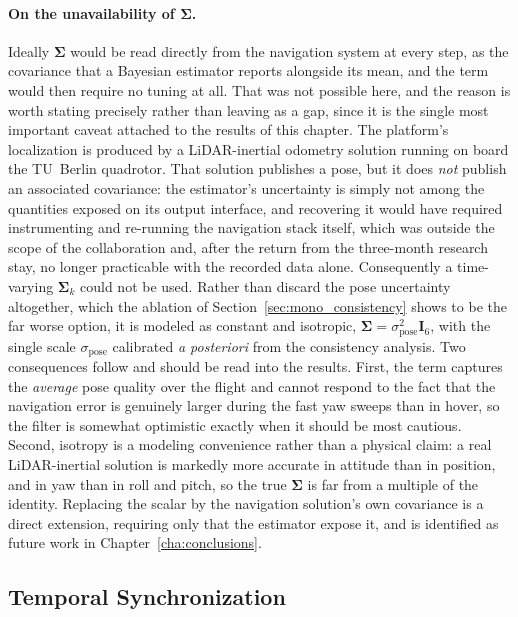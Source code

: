 \paragraph*{On the unavailability of $\bm{\Sigma}$.} Ideally $\bm{\Sigma}$ would be
read directly from the navigation system at every step, as the covariance that a
Bayesian estimator reports alongside its mean, and the term would then require no
tuning at all. That was not possible here, and the reason is worth stating
precisely rather than leaving as a gap, since it is the single most
important caveat attached to the results of this chapter. The platform's
localization is produced by a LiDAR-inertial odometry solution running on board
the TU~Berlin quadrotor. That solution publishes a pose, but it does
\emph{not} publish an associated covariance: the estimator's uncertainty is
simply not among the quantities exposed on its output interface, and recovering it
would have required instrumenting and re-running the navigation stack itself,
which was outside the scope of the collaboration and, after the return from the
three-month research stay, no longer practicable with the recorded data alone.
Consequently a time-varying $\bm{\Sigma}_k$ could not be used. Rather than discard
the pose uncertainty altogether, which the ablation of
Section~\ref{sec:mono_consistency} shows to be the far worse option, it is modeled
as constant and isotropic, $\bm{\Sigma}=\sigma_{\mathrm{pose}}^2\bm{I}_6$, with the
single scale $\sigma_{\mathrm{pose}}$ calibrated \emph{a posteriori} from the
consistency analysis. Two consequences follow and should be read into the results.
First, the term captures the \emph{average} pose quality over the flight and cannot
respond to the fact that the navigation error is genuinely larger during the fast
yaw sweeps than in hover, so the filter is somewhat optimistic exactly when it
should be most cautious. Second, isotropy is a modeling convenience rather than a
physical claim: a real LiDAR-inertial solution is markedly more accurate in
attitude than in position, and in yaw than in roll and pitch, so the true
$\bm{\Sigma}$ is far from a multiple of the identity. Replacing the scalar by the
navigation solution's own covariance is a direct extension, requiring only that
the estimator expose it, and is identified as future work in
Chapter~\ref{cha:conclusions}.

\subsection{Temporal Synchronization}
\label{sec:mono_sync}

